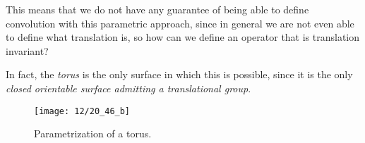 This means that we do not have any guarantee of being able to define convolution with this parametric approach, since in general we are not even able to define what translation is, so how can we define an operator that is translation invariant?

In fact, the \emph{torus} is the only surface in which this is possible, since it is the only \emph{closed orientable surface admitting a translational group}.

\begin{figure}[H]
	\centering
	\texttt{[image: 12/20\_46\_b]}
	\caption{Parametrization of a torus.}\label{fig:torus}	
\end{figure}